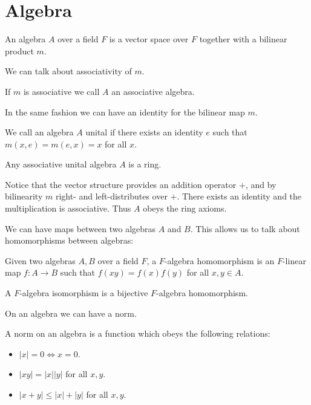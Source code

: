 \documentclass[../Thesis.tex]{subfiles}
\begin{document}
\section{Algebra}
\begin{mydef}
An algebra $A$ over a field $F$ is a vector space over $F$ together with a bilinear product $m$.
\end{mydef}
We can talk about associativity of $m$. 
\begin{mydef}
If $m$ is associative we call $A$ an associative algebra.
\end{mydef}
In the same fashion we can have an identity for the bilinear map $m$.
\begin{mydef}
We call an algebra $A$ unital if there exists an identity $e$ such that $m(x,e) = m(e,x) = x$ for all $x$.
\end{mydef}
\begin{lemma}
Any associative unital algebra $A$ is a ring.
\end{lemma}
\begin{myproof}
Notice that the vector structure provides an addition operator $+$, and by bilinearity $m$ right- and left-distributes over $+$. There exists an identity and the multiplication is associative. Thus $A$ obeys the ring axioms.
\end{myproof}
We can have maps between two algebras $A$ and $B$. This allows us to talk about homomorphisms between algebras:
\begin{mydef}
Given two algebras $A, B$ over a field $F$, a $F$-algebra homomorphism is an $F$-linear map $f: A \rightarrow B$ such that $f(xy) = f(x)f(y)$ for all $x,y \in A$.
\end{mydef}
\begin{mydef}
A $F$-algebra isomorphism is a bijective $F$-algebra homomorphism.
\end{mydef}
On an algebra we can have a norm. 
\begin{mydef}
A norm on an algebra is a function which obeys the following relations:
\begin{itemize}
\item $|x| = 0 \Leftrightarrow x = 0$.
\item $|xy| = |x| |y|$ for all $x, y$.
\item $|x + y| \leq |x| + |y|$ for all $x, y$.
\end{itemize}
\end{mydef}
\end{document}
